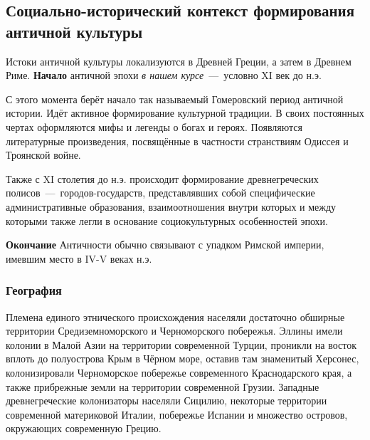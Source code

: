 \subsection{Социально-исторический контекст формирования античной культуры}

Истоки античной культуры локализуются в Древней Греции, а затем в Древнем Риме. 
\textbf{Начало} античной эпохи \textit{в нашем курсе}~---~условно XI век до н.э. 

С этого момента берёт начало так называемый Гомеровский период античной истории. Идёт активное формирование культурной традиции. В своих постоянных чертах оформляются мифы и легенды о богах и героях. Появляются литературные произведения, посвящённые в частности странствиям Одиссея и Троянской войне.

Также с XI столетия до н.э. происходит формирование древнегреческих полисов~---~городов-государств, представлявших собой специфические административные образования, взаимоотношения внутри которых и между которыми также легли в основание социокультурных особенностей эпохи. 

\textbf{Окончание} Античности обычно связывают с упадком Римской империи, имевшим место в IV-V веках н.э. 



\subsubsection{География}
Племена единого этнического происхождения населяли достаточно обширные территории
Средиземноморского и Черноморского побережья. Эллины имели колонии в Малой Азии на территории современной Турции, проникли на восток вплоть до полуострова Крым в Чёрном море, оставив там знаменитый Херсонес, колонизировали Черноморское побережье современного Краснодарского края, а также прибрежные земли на территории современной Грузии. Западные древнегреческие колонизаторы населяли Сицилию, некоторые территории современной материковой Италии, побережье Испании и множество островов, окружающих современную Грецию. 

